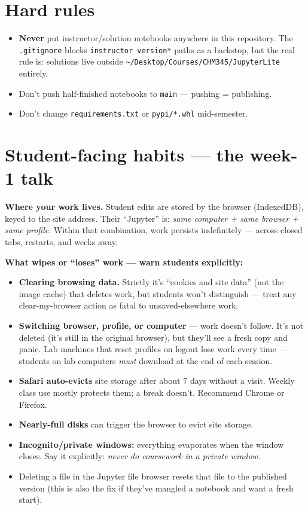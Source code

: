 \documentclass[11pt]{article}
\newcommand{\code}[1]{\texttt{\small #1}}
\begin{document}
\section{Hard rules}

\begin{itemize}[itemsep=2pt]
  \item \textbf{Never} put instructor/solution notebooks anywhere in this
    repository. The \code{.gitignore} blocks \code{*instructor version*} paths
    as a backstop, but the real rule is: solutions live outside
    \code{\textasciitilde/Desktop/Courses/CHM345/JupyterLite} entirely.
  \item Don't push half-finished notebooks to \code{main} --- pushing =
    publishing.
  \item Don't change \code{requirements.txt} or \code{pypi/*.whl} mid-semester.
\end{itemize}

\section{Student-facing habits --- the week-1 talk}

\textbf{Where your work lives.} Student edits are stored by the browser
(IndexedDB), keyed to the site address. Their ``Jupyter'' is: \emph{same
computer + same browser + same profile}. Within that combination, work
persists indefinitely --- across closed tabs, restarts, and weeks away.

\textbf{What wipes or ``loses'' work --- warn students explicitly:}
\begin{itemize}[itemsep=2pt]
  \item \textbf{Clearing browsing data.} Strictly it's ``cookies and site
    data'' (not the image cache) that deletes work, but students won't
    distinguish --- treat any clear-my-browser action as fatal to
    unsaved-elsewhere work.
  \item \textbf{Switching browser, profile, or computer} --- work doesn't
    follow. It's not deleted (it's still in the original browser), but they'll
    see a fresh copy and panic. Lab machines that reset profiles on logout
    lose work every time --- students on lab computers \emph{must} download at
    the end of each session.
  \item \textbf{Safari auto-evicts} site storage after about 7 days without a
    visit. Weekly class use mostly protects them; a break doesn't. Recommend
    Chrome or Firefox.
  \item \textbf{Nearly-full disks} can trigger the browser to evict site
    storage.
  \item \textbf{Incognito/private windows:} everything evaporates when the
    window closes. Say it explicitly: \emph{never do coursework in a private
    window.}
  \item Deleting a file in the Jupyter file browser resets that file to the
    published version (this is also the fix if they've mangled a notebook and
    want a fresh start).
\end{itemize}
\end{document}
